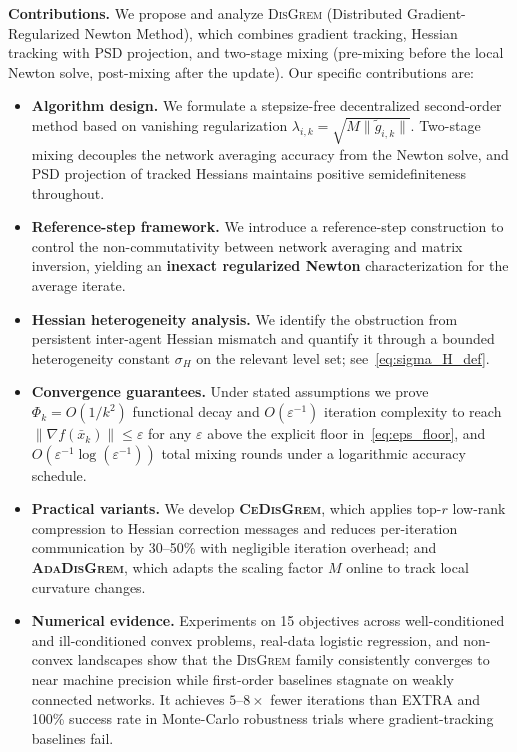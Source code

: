\documentclass[11pt,a4paper]{article}
\def\cO{O}%
\newcommand{\cO}{\mathcal{O}}
\begin{document}
\noindent\textbf{Contributions.}
We propose and analyze \textsc{DisGrem} (Distributed Gradient-Regularized Newton Method),
which combines gradient tracking, Hessian tracking with PSD projection, and two-stage
mixing (pre-mixing before the local Newton solve, post-mixing after the update).
Our specific contributions are:
\begin{itemize}[leftmargin=1.2em,itemsep=2pt]
	\item \textbf{Algorithm design.}
	We formulate a stepsize-free decentralized second-order method based on vanishing regularization
	$\lambda_{i,k}=\sqrt{M\|\tilde g_{i,k}\|}$.
	Two-stage mixing decouples the network averaging accuracy from the Newton solve,
	and PSD projection of tracked Hessians maintains positive semidefiniteness throughout.
	
	\item \textbf{Reference-step framework.}
	We introduce a reference-step construction to control the non-commutativity between network averaging
	and matrix inversion, yielding an \textbf{inexact regularized Newton} characterization for the average iterate.
	
	\item \textbf{Hessian heterogeneity analysis.}
	We identify the obstruction from persistent inter-agent Hessian mismatch and quantify it through
	a bounded heterogeneity constant $\sigma_H$ on the relevant level set; see~\eqref{eq:sigma_H_def}.
	
	\item \textbf{Convergence guarantees.}
	Under stated assumptions we prove $\Phi_k=\cO(1/k^2)$ functional decay and
	\textbf{$\cO(\varepsilon^{-1})$} iteration complexity to reach $\|\nabla f(\bar x_k)\|\le \varepsilon$
	for any $\varepsilon$ above the explicit floor in~\eqref{eq:eps_floor},
	and \textbf{$\cO(\varepsilon^{-1}\log(\varepsilon^{-1}))$} total mixing rounds under a logarithmic accuracy schedule.
	
	\item \textbf{Practical variants.}
	We develop \textbf{\textsc{CeDisGrem}}, which applies top-$r$ low-rank compression to Hessian correction messages
	and reduces per-iteration communication by 30--50\% with negligible iteration overhead;
	and \textbf{\textsc{AdaDisGrem}}, which adapts the scaling factor $M$ online to track local curvature changes.
	
	\item \textbf{Numerical evidence.}
	Experiments on 15 objectives across well-conditioned and ill-conditioned convex problems, real-data logistic regression,
	and non-convex landscapes show that the \textsc{DisGrem} family consistently converges to near machine precision while
	first-order baselines stagnate on weakly connected networks.
	It achieves $5$--$8\times$ fewer iterations than EXTRA and 100\% success rate in Monte-Carlo robustness trials
	where gradient-tracking baselines fail.
\end{itemize}
	
\end{document}
